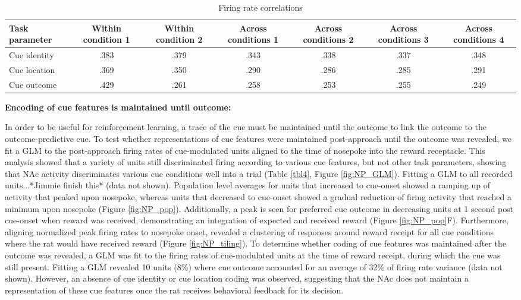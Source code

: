 \documentclass[11pt]{article}
\begin{document}
\begin{table}[p]
\centering
\setlength{\tabcolsep}{1 em} %
\begin{tabular}{l c  c c c c c}

Task parameter                                 & Within condition 1        &Within condition 2        & Across conditions 1        &Across conditions 2       &Across conditions 3       &Across conditions 4\\
\hline
Cue identity       & .383         &.379          & .343          & .338          &.337        &.348\\
\hline
Cue location       & .369         &.350          & .290          & .286          & .285        &.291\\
\hline
Cue outcome       & .429        &.261          & .258        & .253          & .255        &.249\\
\hline

\end{tabular}
\caption {Firing rate correlations} \label{tbl3} 
\end{table}

{\bf Encoding of cue features is maintained until outcome:}

In order to be useful for reinforcement learning, a trace of the cue must be maintained until the outcome to link the outcome to the outcome-predictive cue. To test whether representations of cue features were maintained post-approach until the outcome was revealed, we fit a GLM to the post-approach firing rates of cue-modulated units aligned to the time of nosepoke into the reward receptacle. This analysis showed that a variety of units still discriminated firing according to various cue features, but not other task parameters, showing that NAc activity discriminates various cue conditions well into a trial (Table \ref{tbl4}, Figure \ref{fig:NP_GLM}). Fitting a GLM to all recorded units...*Jimmie finish this* (data not shown). Population level averages for units that increased to cue-onset showed a ramping up of activity that peaked upon nosepoke, whereas units that decreased to cue-onset showed a gradual reduction of firing activity that reached a minimum upon nosepoke (Figure \ref{fig:NP_pop}). Additionally, a peak is seen for preferred cue outcome in decreasing units at 1 second post cue-onset when reward was received, demonstrating an integration of expected and received reward (Figure \ref{fig:NP_pop}F). Furthermore, aligning normalized peak firing rates to nosepoke onset, revealed a clustering of responses around reward receipt for all cue conditions where the rat would have received reward (Figure \ref{fig:NP_tiling}). To determine whether coding of cue features was maintained after the outcome was revealed, a GLM was fit to the firing rates of cue-modulated units at the time of reward receipt, during which the cue was still present. Fitting a GLM revealed 10 units (8\%) where cue outcome accounted for an average of 32\% of firing rate variance (data not shown). However, an absence of cue identity or cue location coding was observed, suggesting that the NAc does not maintain a representation of these cue features once the rat receives behavioral feedback for its decision.
\end{document}

